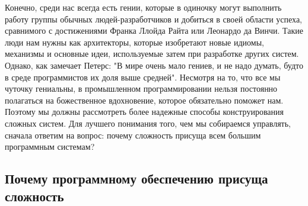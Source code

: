 \documentclass[11pt]{article}
\begin{document}
\par
Конечно, среди нас всегда есть гении, которые в одиночку могут выполнить работу группы обычных людей-разработчиков и добиться в своей области успеха, сравнимого с достижениями Франка Ллойда Райта или Леонардо да Винчи. Такие люди нам нужны как архитекторы, которые изобретают новые идиомы, механизмы и основные идеи, используемые затем при разработке других систем. Однако, как замечает Петерс: "В мире очень мало гениев, и не надо думать, будто в среде программистов их доля выше средней". Несмотря на то, что все мы чуточку гениальны, в промышленном программировании нельзя постоянно полагаться на божественное вдохновение, которое обязательно поможет нам. Поэтому мы должны рассмотреть более надежные способы конструирования сложных систем. Для лучшего понимания того, чем мы собираемся управлять, сначала ответим на вопрос: почему сложность присуща всем большим программным системам? 
\parskip=0pt
\subsection{Почему программному обеспечению присуща сложность}
\
\end{document}
